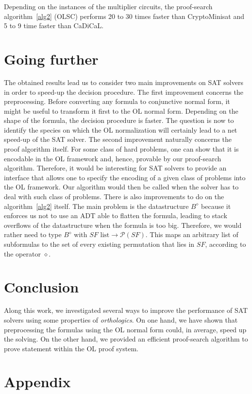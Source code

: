 \documentclass[a4paper, 11pt]{article}
\begin{document}
    Depending on the instances of the multiplier circuits, the proof-search algorithm~\ref{alg2} (OLSC) 
    performs 20 to 30 times faster than CryptoMinisat and 5 to 9 time faster than CaDiCaL.

    \section{Going further}
    The obtained results lead us to consider two main improvements on SAT solvers in order to speed-up 
    the decision procedure. The first improvement concerns the preprocessing. Before converting any 
    formula to
    conjunctive normal form, it might be useful to transform it first to the OL normal form. Depending
    on the shape of the formula, the decision procedure is faster. The question is now to identify the
    species on which the OL normalization will certainly lead to a net speed-up of the SAT solver. 
    The second improvement naturally 
    concerns the proof algorithm itself. For some class of hard problems, one can show that it is
    encodable in the OL framework and, hence, provable by our proof-search algorithm. Therefore, it
    would be interesting for SAT solvers to provide an interface that allows one to specify the
    encoding of a given class of problems into the OL framework. Our algorithm would then be called
    when the solver has to deal with such class of problems. There is also improvements to do on the
    algorithm~\ref{alg2} itself. The main problem is the datastructure $B^\diamond$ because it enforces
    us not to use an ADT able to flatten the formula, leading to stack overflows of the datastructure
    when the formula is too big. Therefore, we would rather need to type $B^\diamond$ with 
    $SF\text{ list}\rightarrow\mathcal{P}(SF)$. This maps an arbitrary list of subformulas to
    the set of every existing permutation that lies in $SF$, according to the operator $\diamond$.
    \section{Conclusion} 
    Along this work, we investigated several ways to improve the performance of SAT solvers using
    some properties of \textit{orthologics}. On one hand, we have shown that preprocessing the formulas 
    using the OL normal form could, in average, speed up the solving. On the other hand, we provided an
    efficient proof-search algorithm to prove statement within the OL proof system.
    \section{Appendix}
    
    
\end{document}
